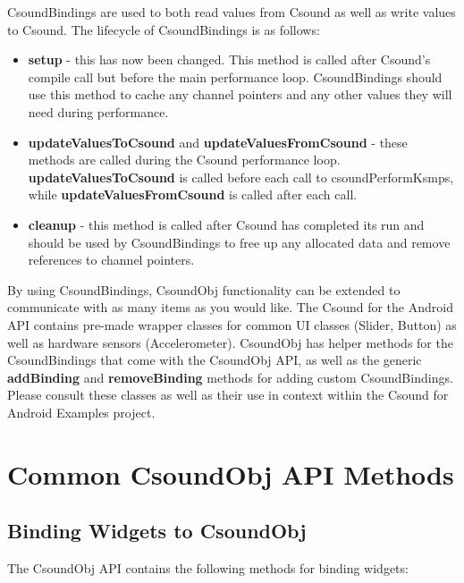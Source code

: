 \documentclass[11pt]{article}
\begin{document}
CsoundBindings are used to both read values from Csound as well as write values to Csound.  The lifecycle of CsoundBindings is as follows:

\begin{itemize}
\item \textbf{setup} - this has now been changed. This method is called after Csound's compile call but before the main performance loop. CsoundBindings should use this method to cache any channel pointers and any other values they will need during performance.
\item \textbf{updateValuesToCsound} and \textbf{updateValuesFromCsound} - these methods are called during the Csound performance loop. \textbf{updateValuesToCsound} is called before each call to csoundPerformKsmps, while \textbf{updateValuesFromCsound} is called after each call. 
\item \textbf{cleanup} - this method is called after Csound has completed its run and should be used by CsoundBindings to free up any allocated data and remove references to channel pointers.
\end{itemize}

By using CsoundBindings, CsoundObj functionality can be extended to communicate with as many items as you would like. The Csound for the Android API contains pre-made wrapper classes for common UI classes (Slider, Button) as well as hardware sensors (Accelerometer).  CsoundObj has helper methods for the CsoundBindings that come with the CsoundObj API, as well as the generic \textbf{addBinding} and \textbf{removeBinding} methods for adding custom CsoundBindings. Please consult these classes as well as their use in context within the Csound for Android Examples project.



\section{Common CsoundObj API Methods}

\subsection{Binding Widgets to CsoundObj}

The CsoundObj API contains the following methods for binding widgets:
\end{document}
